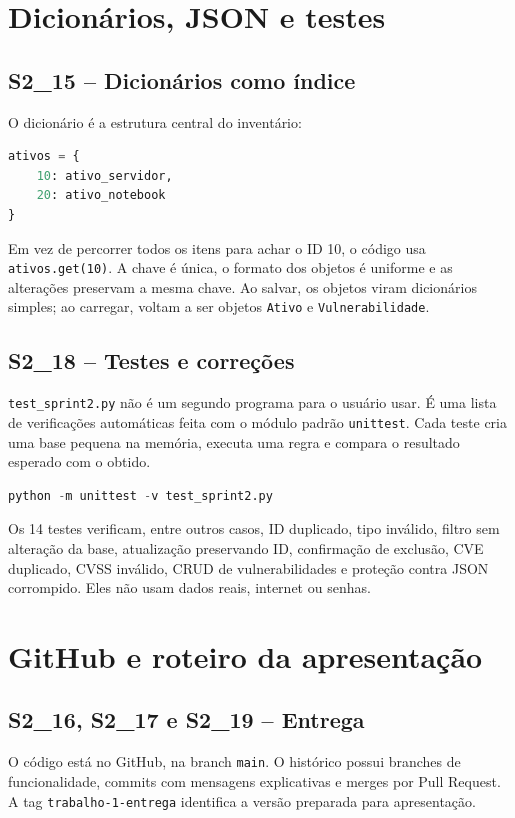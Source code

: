 \documentclass[11pt,a4paper]{article}
\newcommand{\cardsection}[1]{\Needspace{12\baselineskip}\subsection{#1}}
\begin{document}
\section{Dicionários, JSON e testes}

\cardsection{S2\_15 -- Dicionários como índice}

O dicionário é a estrutura central do inventário:

\begin{lstlisting}[language=Python,caption={Estrutura principal na memória}]
ativos = {
    10: ativo_servidor,
    20: ativo_notebook
}
\end{lstlisting}

Em vez de percorrer todos os itens para achar o ID 10, o código usa \texttt{ativos.get(10)}. A chave é única, o formato dos objetos é uniforme e as alterações preservam a mesma chave. Ao salvar, os objetos viram dicionários simples; ao carregar, voltam a ser objetos \texttt{Ativo} e \texttt{Vulnerabilidade}.

\cardsection{S2\_18 -- Testes e correções}

\texttt{test\_sprint2.py} não é um segundo programa para o usuário usar. É uma lista de verificações automáticas feita com o módulo padrão \texttt{unittest}. Cada teste cria uma base pequena na memória, executa uma regra e compara o resultado esperado com o obtido.

\begin{lstlisting}[language=Python,caption={Como executar os testes}]
python -m unittest -v test_sprint2.py
\end{lstlisting}

Os 14 testes verificam, entre outros casos, ID duplicado, tipo inválido, filtro sem alteração da base, atualização preservando ID, confirmação de exclusão, CVE duplicado, CVSS inválido, CRUD de vulnerabilidades e proteção contra JSON corrompido. Eles não usam dados reais, internet ou senhas.

\section{GitHub e roteiro da apresentação}

\cardsection{S2\_16, S2\_17 e S2\_19 -- Entrega}

O código está no GitHub, na branch \texttt{main}. O histórico possui branches de funcionalidade, commits com mensagens explicativas e merges por Pull Request. A tag \texttt{trabalho-1-entrega} identifica a versão preparada para apresentação.
\end{document}
